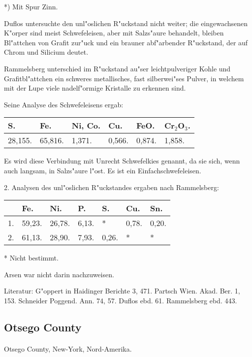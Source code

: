 \documentclass[a4paper, 11pt, oneside]{article}
\begin{document}
*) Mit Spur Zinn.

Duflos untersuchte den unl"oslichen R"uckstand nicht weiter; die eingewachsenen K"orper sind meist Schwefeleisen, aber mit Salzs"aure behandelt, bleiben Bl"attchen von Grafit zur"uck und ein brauner abf"arbender R"uckstand, der auf Chrom und Silicium deutet.

Rammelsberg unterschied im R"uckstand au"ser leichtpulveriger Kohle und Grafitbl"attchen ein schweres metallisches, fast silberwei"ses Pulver, in welchem mit der Lupe viele nadelf"ormige Kristalle zu erkennen sind.

Seine Analyse des Schwefeleisens ergab:
\begin{table}[H]
    \centering
    \begin{tabular}{l l l l l l}
        S. & Fe. & Ni, Co. & Cu. & FeO. & Cr$_{2}$O$_{3}$. \\ \hline
        28,155. & 65,816. & 1,371. & 0,566. & 0,874. & 1,858. \\
    \end{tabular}
\end{table}

Es wird diese Verbindung mit Unrecht Schwefelkies genannt, da sie sich, wenn auch langsam, in Salzs"aure l"ost. Es ist ein Einfachschwefeleisen.

2. Analysen des unl"oslichen R"uckstandes ergaben nach Rammelsberg:
\begin{table}[H]
    \centering
    \begin{tabular}{l l l l l l l}
         & Fe. & Ni. & P. & S. & Cu. & Sn. \\ \hline
        1. & 59,23. & 26,78. & 6,13. & * & 0,78. & 0,20. \\
        2. & 61,13. & 28,90. & 7,93. & 0,26. & * & * \\
    \end{tabular}
\end{table}

* Nicht bestimmt.

Arsen war nicht darin nachzuweisen.

\footnotesize
Literatur: G"oppert in Haidinger Berichte 3, 471. Partsch Wien. Akad. Ber. 1, 153. Schneider Poggend. Ann. 74, 57. Duflos ebd. 61. Rammelsberg ebd. 443.

\subsection{Otsego County}
\normalsize
\paragraph{}
Otsego County, New-York, Nord-Amerika.
\end{document}
